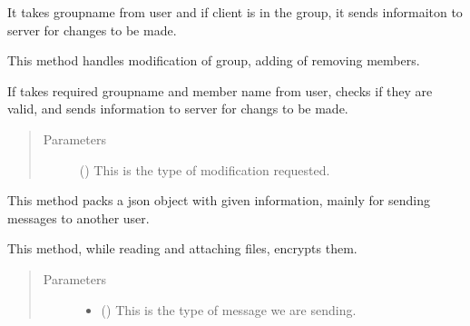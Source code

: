 \documentclass[letterpaper,10pt,english]{sphinxmanual}
\begin{document}
\begin{fulllineitems}
\begin{fulllineitems}
It takes groupname from user and if client is in the group, it sends informaiton to server for changes to be made.

\end{fulllineitems}


\begin{fulllineitems}
\label{\detokenize{clientHelper:clientHelper.Client.modifyGroup}}
This method handles modification of group, adding of removing members.

If takes required groupname and member name from user, checks if they are valid, and sends information to server for changs to be made.
\begin{quote}\begin{description}
\item[{Parameters}] \leavevmode
{} () \textendash{} This is the type of modification requested.

\end{description}\end{quote}

\end{fulllineitems}


\begin{fulllineitems}
\label{\detokenize{clientHelper:clientHelper.Client.packJSON}}
This method packs a json object with given information, mainly for sending messages to another user.

This method, while reading and attaching files, encrypts them.
\begin{quote}\begin{description}
\item[{Parameters}] \leavevmode\begin{itemize}
\item {} 
 () \textendash{} This is the type of message we are sending.


\end{itemize}
\end{description}
\end{quote}
\end{fulllineitems}
\end{fulllineitems}
\end{document}
